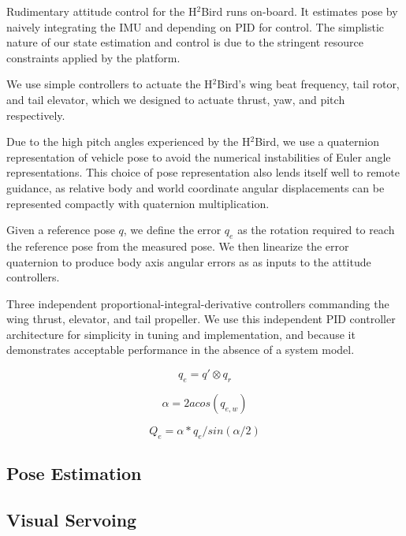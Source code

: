 \documentclass[letterpaper, 10 pt, conference]{ieeeconf}
\begin{document}
Rudimentary attitude control for the H$^2$Bird runs on-board. It estimates pose by naively integrating the IMU and depending on PID for control. The simplistic nature of our state estimation and control is due to the stringent resource constraints applied by the platform.

We use simple controllers to actuate the H$^2$Bird's wing beat frequency, tail rotor, and tail elevator, which we designed to actuate thrust, yaw, and pitch respectively.

Due to the high pitch angles experienced by the H$^2$Bird, we use a quaternion representation of vehicle pose to avoid the numerical instabilities of Euler angle representations. This choice of pose representation also lends itself well to remote guidance, as relative body and world coordinate angular displacements can be represented compactly with quaternion multiplication.  

Given a reference pose $q$, we define the error $q_e$ as the rotation required to reach the reference pose from the measured pose. We then linearize the error quaternion to produce body axis angular errors as as inputs to the attitude controllers. 

Three independent proportional-integral-derivative controllers commanding the wing thrust, elevator, and tail propeller. We use this independent PID controller architecture for simplicity in tuning and implementation, and because it demonstrates acceptable performance in the absence of a system model.

\begin{equation}
\label{quat_error}
q_e = q'\otimes q_r
\end{equation}

\begin{equation}
\label{quat_angle}
\alpha = 2acos(q_{e,w})
\end{equation}

\begin{equation}
\label{quat_linearize}
Q_e = \alpha*q_e/sin(\alpha /2)
\end{equation}

\subsection{Pose Estimation}

\subsection{Visual Servoing}
\end{document}

